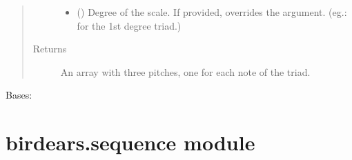 \documentclass[letterpaper,10pt,english]{sphinxmanual}
\begin{document}
\begin{fulllineitems}
\begin{fulllineitems}
\begin{quote}
\begin{description}
\begin{itemize}
\item {} 
 () \textendash{} Degree of the scale. If provided, overrides the
 argument. (eg.:  for the 1st degree triad.)

\end{itemize}

\item[{Returns}] \leavevmode
An array with three pitches, one for each note of the triad.

\end{description}\end{quote}

\end{fulllineitems}


\end{fulllineitems}


\begin{fulllineitems}
\label{\detokenize{index:birdears.scale.ScaleBase}}
Bases: 

\end{fulllineitems}



\section{birdears.sequence module}
\label{\detokenize{index:module-birdears.sequence}}\label{\detokenize{index:birdears-sequence-module}}
\end{document}

